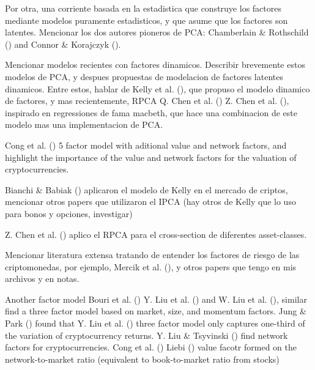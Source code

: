 \documentclass[
  12pt,
  a4paper,
  openany]{scrbook}
\begin{document}
Por otra, una corriente basada en la estadistica que construye los
factores mediante modelos puramente estadisticos, y que asume que los
factores son latentes. Mencionar los dos autores pioneros de PCA:
Chamberlain \& Rothschild
() and Connor \&
Korajczyk ().

Mencionar modelos recientes con factores dinamicos. Describir brevemente
estos modelos de PCA, y despues propuestas de modelacion de factores
latentes dinamicos. Entre estos, hablar de Kelly et al.
(), que propuso el
modelo dinamico de factores, y mas recientemente, RPCA Q. Chen et al.
() Z. Chen et al.
(), inspirado en regressiones de
fama macbeth, que hace una combinacion de este modelo mas una
implementacion de PCA.

Cong et al. () 5 factor model
with aditional value and network factors, and highlight the importance
of the value and network factors for the valuation of cryptocurrencies.

Bianchi \& Babiak
() aplicaron
el modelo de Kelly en el mercado de criptos, mencionar otros papers que
utilizaron el IPCA (hay otros de Kelly que lo uso para bonos y opciones,
investigar)

Z. Chen et al. () aplico el RPCA
para el cross-section de diferentes asset-classes.

Mencionar literatura extensa tratando de entender los factores de riesgo
de las criptomonedas, por ejemplo, Mercik et al.
(),
y otros papers que tengo en mis archivos y en notas.

Another factor model Bouri et al.
() Y. Liu et al.
() and W. Liu et al.
(), similar find a three factor
model based on market, size, and momentum factors. Jung \& Park
() found that Y. Liu et al.
() three factor model only
captures one-third of the variation of cryptocurrency returns. Y. Liu \&
Tsyvinski () find network
factors for cryptocurrencies. Cong et al.
() Liebi
() value facotr formed on the
network-to-market ratio (equivalent to book-to-market ratio from stocks)
\end{document}
